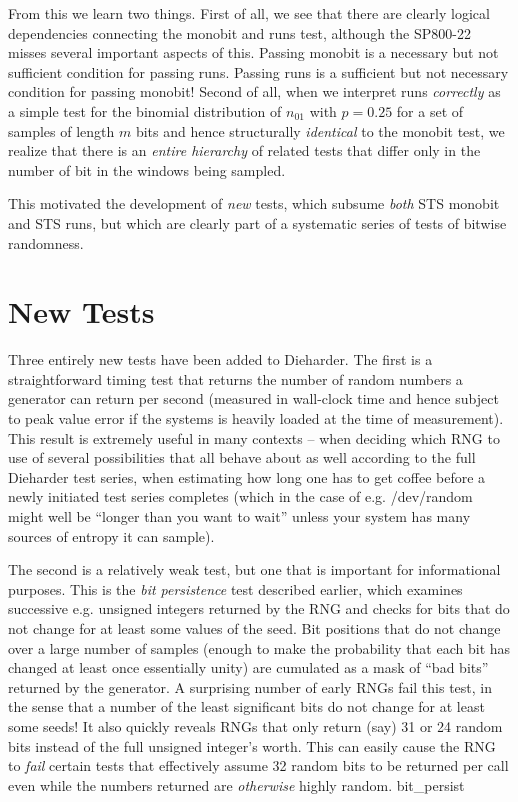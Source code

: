 \documentclass{book}
\begin{document}
From this we learn two things.  First of all, we see that there are
clearly logical dependencies connecting the monobit and runs test,
although the SP800-22 misses several important aspects of this.  Passing
monobit is a necessary but not sufficient condition for passing runs.
Passing runs is a sufficient but not necessary condition for passing
monobit!  Second of all, when we interpret runs {\em correctly} as a
simple test for the binomial distribution of $n_{01}$ with $p = 0.25$
for a set of samples of length $m$ bits and hence structurally {\em
identical} to the monobit test, we realize that there is an {\em entire
hierarchy} of related tests that differ only in the number of bit in the
windows being sampled.

This motivated the development of {\em new} tests, which subsume {\em
both} STS monobit and STS runs, but which are clearly part of a
systematic series of tests of bitwise randomness.

\section{New Tests}

Three entirely new tests have been added to Dieharder.  The first is a
straightforward timing test that returns the number of random numbers a
generator can return per second (measured in wall-clock time and hence
subject to peak value error if the systems is heavily loaded at the time
of measurement).  This result is extremely useful in many contexts --
when deciding which RNG to use of several possibilities that all behave
about as well according to the full Dieharder test series, when
estimating how long one has to get coffee before a newly initiated test
series completes (which in the case of e.g. /dev/random might well be
``longer than you want to wait'' unless your system has many sources of
entropy it can sample).

The second is a relatively weak test, but one that is important for
informational purposes.  This is the {\em bit persistence} test
described earlier, which examines successive e.g. unsigned integers
returned by the RNG and checks for bits that do not change for at least
some values of the seed.  Bit positions that do not change over a large
number of samples (enough to make the probability that each bit has
changed at least once essentially unity) are cumulated as a mask of
``bad bits'' returned by the generator.  A surprising number of early
RNGs fail this test, in the sense that a number of the least significant
bits do not change for at least some seeds!  It also quickly reveals
RNGs that only return (say) 31 or 24 random bits instead of the full
unsigned integer's worth.  This can easily cause the RNG to {\em fail}
certain tests that effectively assume 32 random bits to be returned per
call even while the numbers returned are {\em otherwise} highly random.
bit\_persist
\end{document}
